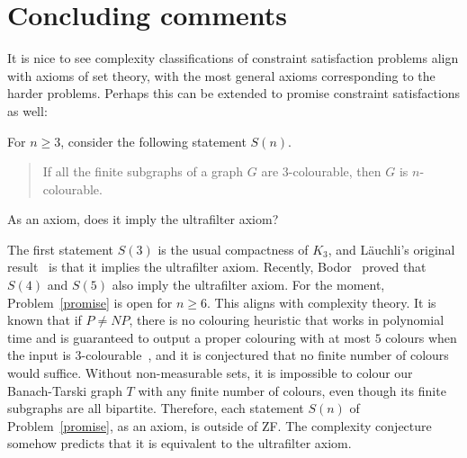 \documentclass{lmcs}
\begin{document}
\section{Concluding comments} \label{problems} 
It is nice to see complexity classifications of constraint satisfaction problems align with axioms of set theory, 
with the most general axioms corresponding to the harder problems.
Perhaps this can be extended to promise constraint satisfactions 
as well:
\begin{samepage}
\begin{prob}\label{promise}
For $n \geq 3$, consider the following statement $S(n)$.
\begin{quote}
If all the finite subgraphs of a graph $G$ are $3$-colourable,
then $G$ is $n$-colourable.
\end{quote}
As an axiom, does it imply the ultrafilter axiom?
\end{prob}
\end{samepage}
The first statement $S(3)$ is the usual compactness of $K_3$, 
and L\"{a}uchli's original result~\cite{lauchli} is that
it implies the ultrafilter axiom. Recently,
Bodor~\cite{bodor} proved that $S(4)$ and $S(5)$
also imply the ultrafilter axiom. For the moment,
Problem~\ref{promise} is open for $n \geq 6$.
This aligns with complexity theory. It is known that if 
$P \neq NP$, there is no colouring heuristic that works in polynomial time and is guaranteed to output a proper colouring 
with at most $5$ colours when the input
is $3$-colourable~\cite{bbko}, and it is conjectured that no 
finite number of colours would suffice.
Without non-measurable sets, it is impossible to colour our 
Banach-Tarski graph $T$ with any finite number of colours, 
even though its finite subgraphs are all bipartite.
Therefore, each statement $S(n)$ of Problem~\ref{promise}, 
as an axiom, is outside of ZF.
The complexity conjecture somehow predicts that
it is equivalent to the ultrafilter axiom. 
\end{document}
